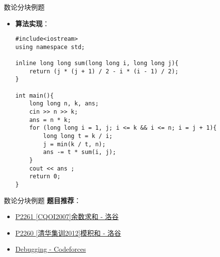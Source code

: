 \begin{frame}[fragile]{数论分块}{例题}
  
  \begin{itemize}
    \item \textbf{算法实现}：
      \begin{lstlisting}
#include<iostream>
using namespace std;

inline long long sum(long long i, long long j){
    return (j * (j + 1) / 2 - i * (i - 1) / 2);
}

int main(){
    long long n, k, ans;
    cin >> n >> k;
    ans = n * k;
    for (long long i = 1, j; i <= k && i <= n; i = j + 1){
        long long t = k / i;
        j = min(k / t, n);
        ans -= t * sum(i, j);
    }
    cout << ans ;
    return 0;
}
    \end{lstlisting}
  \end{itemize}
\end{frame}

\begin{frame}[fragile]{数论分块}{例题}
  \textbf{题目推荐}：
  \begin{itemize}
    \item \href{https://www.luogu.com.cn/problem/P2261}{P2261 [CQOI2007]余数求和 - 洛谷}
    \item \href{https://www.luogu.com.cn/problem/P2260}{P2260 [清华集训2012]模积和 - 洛谷}
    \item \href{https://codeforces.com/gym/101485/attachments}{Debugging - Codeforces}
  \end{itemize}
\end{frame}